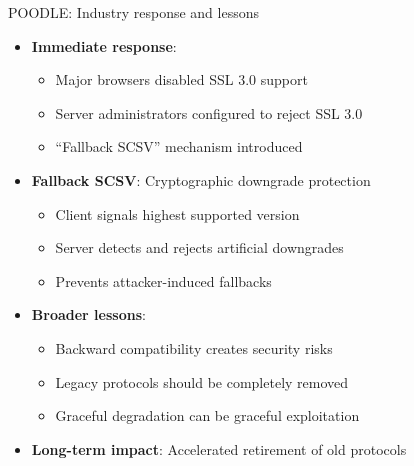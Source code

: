 \documentclass[aspectratio=169, lualatex, handout]{beamer}
\begin{document}
\begin{frame}{POODLE: Industry response and lessons}
	\begin{itemize}
		\item \textbf{Immediate response}:
		      \begin{itemize}
			      \item Major browsers disabled SSL 3.0 support
			      \item Server administrators configured to reject SSL 3.0
			      \item ``Fallback SCSV'' mechanism introduced
		      \end{itemize}
		\item \textbf{Fallback SCSV}: Cryptographic downgrade protection
		      \begin{itemize}
			      \item Client signals highest supported version
			      \item Server detects and rejects artificial downgrades
			      \item Prevents attacker-induced fallbacks
		      \end{itemize}
		\item \textbf{Broader lessons}:
		      \begin{itemize}
			      \item Backward compatibility creates security risks
			      \item Legacy protocols should be completely removed
			      \item Graceful degradation can be graceful exploitation
		      \end{itemize}
		\item \textbf{Long-term impact}: Accelerated retirement of old protocols
	\end{itemize}
\end{frame}
\end{document}
